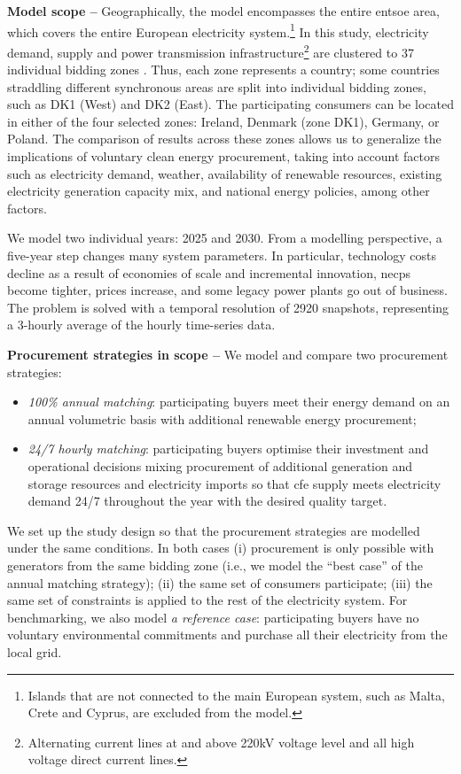 \textbf{Model scope --} Geographically, the model encompasses the entire \gls{entsoe} area, which covers the entire European electricity system.\footnote{Islands that are not connected to the main European system, such as Malta, Crete and Cyprus, are excluded from the model.}
In this study, electricity demand, supply and power transmission infrastructure\footnote{Alternating current lines at and above 220kV voltage level and all high voltage direct current lines.} are clustered to 37 individual bidding zones \cite{PyPSAEur-docs-spatialresolution}. 
Thus, each zone represents a country; some countries straddling different synchronous areas are split into individual bidding zones, such as DK1 (West) and DK2 (East).
The participating consumers can be located in either of the four selected zones: Ireland, Denmark (zone DK1), Germany, or Poland.
The comparison of results across these zones allows us to generalize the implications of voluntary clean energy procurement, taking into account factors such as electricity demand, weather, availability of renewable resources, existing electricity generation capacity mix, and national energy policies, among other factors.

We model two individual years: 2025 and 2030. 
From a modelling perspective, a five-year step changes many system parameters.
In particular, technology costs decline as a result of economies of scale and incremental innovation, \gls{necp}s become tighter, \co prices increase, and some legacy power plants go out of business.
The problem is solved with a temporal resolution of 2920 snapshots, representing a 3-hourly average of the hourly time-series data.

\textbf{Procurement strategies in scope --} We model and compare two procurement strategies: 

\begin{itemize}[-]
    \item \textit{100\% annual matching}: participating buyers meet their energy demand on an annual volumetric basis with additional renewable energy procurement;
    \item \textit{24/7 hourly matching}: participating buyers optimise their investment and operational decisions mixing procurement of additional generation and storage resources and electricity imports so that \gls{cfe} supply meets electricity demand 24/7 throughout the year with the desired quality target.
\end{itemize}

We set up the study design so that the procurement strategies are modelled under the same conditions.
In both cases (i) procurement is only possible with generators from the same bidding zone (i.e., we model the \enquote{best case} of the annual matching strategy); (ii) the same set of consumers participate; (iii) the same set of constraints is applied to the rest of the electricity system. 
For benchmarking, we also model \textit{a reference case}: participating buyers have no voluntary environmental commitments and purchase all their electricity from the local grid.

